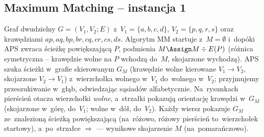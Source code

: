 \subsection{Maximum Matching -- instancja 1}

Graf dwudzielny $G = (V_1, V_2; E)$ z~$V_1 = \{a, b, c, d\}$, $V_2 = \{p, q, r, s\}$
oraz krawędziami $ap, aq, bp, br, cq, cr, cs, ds$. Algorytm \textsc{MM} startuje
z~$M = \emptyset$ i~dopóki \textsc{APS} zwraca ścieżkę powiększającą $P$,
podmienia $M \Assign M \div E(P)$ (różnica symetryczna -- krawędzie wolne na
$P$ wchodzą do~$M$, skojarzone wychodzą). \textsc{APS} szuka ścieżki w~grafie
skierowanym $G_M$ (krawędzie wolne kierowane $V_1 \to V_2$, skojarzone
$V_2 \to V_1$) z~wierzchołka wolnego w~$V_1$ do~wolnego w~$V_2$; przyjmujemy
przeszukiwanie w~głąb, odwiedzając sąsiadów alfabetycznie. Na~rysunkach
pierścień otacza wierzchołki \emph{wolne}, a~strzałki pokazują orientację
krawędzi w~$G_M$ (skojarzone w~górę, do~$V_1$; wolne w~dół, do~$V_2$).
Każdy wiersz pokazuje $G_M$ ze~znalezioną ścieżką powiększającą
(\textcolor{path}{na~różowo}, różowy pierścień to~wierzchołek startowy),
a~po~strzałce $\Rightarrow$ --- wynikowe skojarzenie $M$
(\textcolor{accentB}{na~pomarańczowo}).

\newcommand{\mmfreeR}[1]{\ifx\relax#1\relax\else
	\foreach \n in {#1} {\draw[black] (\n) circle (3.5pt);}\fi}
\newcommand{\mmedges}[8]{%
	\foreach \x/\n in {0/a, 1/b, 2/c, 3/d} {\node[mmnode, label=above:$\n$] (\n) at (\x,1) {};}
	\foreach \x/\n in {0/p, 1/q, 2/r, 3/s} {\node[mmnode, label=below:$\n$] (\n) at (\x,0) {};}
	\draw[->,#1] (a)--(p); \draw[->,#2] (a)--(q); \draw[->,#3] (b)--(p); \draw[->,#4] (b)--(r);
	\draw[->,#5] (c)--(q); \draw[->,#6] (c)--(r); \draw[->,#7] (c)--(s); \draw[->,#8] (d)--(s);}
\newcommand{\mmpanel}[4]{%
	\begin{tikzpicture}[x=0.8cm, y=0.9cm, scale=0.78, >=stealth, baseline=(current bounding box.center)]
		\mmedges#1\mmfreeR{#3}%
		\ifx\relax#4\relax\else\draw[path, line width=1.4pt] (#4) circle (3.5pt);\fi
		\node[font=\footnotesize] at (1.5,-0.95) {#2};\end{tikzpicture}}


